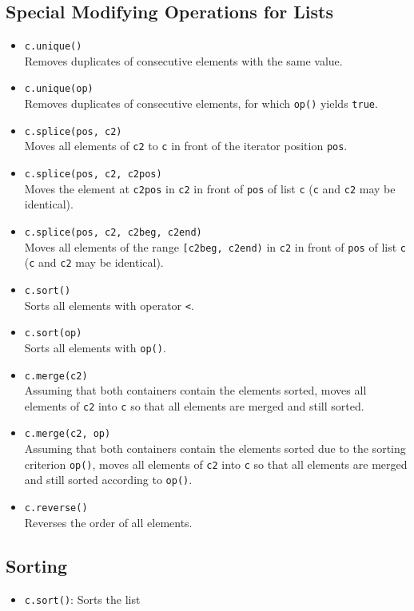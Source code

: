\documentclass{report}
\begin{document}
\subsection{Special Modifying Operations for Lists}
\begin{itemize}
    \item \texttt{c.unique()} \\
    Removes duplicates of consecutive elements with the same value.
    
    \item \texttt{c.unique(op)} \\
    Removes duplicates of consecutive elements, for which \texttt{op()} yields \texttt{true}.
    
    \item \texttt{c.splice(pos, c2)} \\
    Moves all elements of \texttt{c2} to \texttt{c} in front of the iterator position \texttt{pos}.
    
    \item \texttt{c.splice(pos, c2, c2pos)} \\
    Moves the element at \texttt{c2pos} in \texttt{c2} in front of \texttt{pos} of list \texttt{c} (\texttt{c} and \texttt{c2} may be identical).
    
    \item \texttt{c.splice(pos, c2, c2beg, c2end)} \\
    Moves all elements of the range \texttt{[c2beg, c2end)} in \texttt{c2} in front of \texttt{pos} of list \texttt{c} (\texttt{c} and \texttt{c2} may be identical).
    
    \item \texttt{c.sort()} \\
    Sorts all elements with operator \texttt{<}.
    
    \item \texttt{c.sort(op)} \\
    Sorts all elements with \texttt{op()}.
    
    \item \texttt{c.merge(c2)} \\
    Assuming that both containers contain the elements sorted, moves all elements of \texttt{c2} into \texttt{c} so that all elements are merged and still sorted.
    
    \item \texttt{c.merge(c2, op)} \\
    Assuming that both containers contain the elements sorted due to the sorting criterion \texttt{op()}, moves all elements of \texttt{c2} into \texttt{c} so that all elements are merged and still sorted according to \texttt{op()}.
    
    \item \texttt{c.reverse()} \\
    Reverses the order of all elements.
\end{itemize}

\bigbreak \noindent 
\subsection{Sorting}
\bigbreak \noindent 
\begin{itemize}
    \item \texttt{c.sort()}: Sorts the list
\end{itemize}

\pagebreak 
{}
\end{document}
